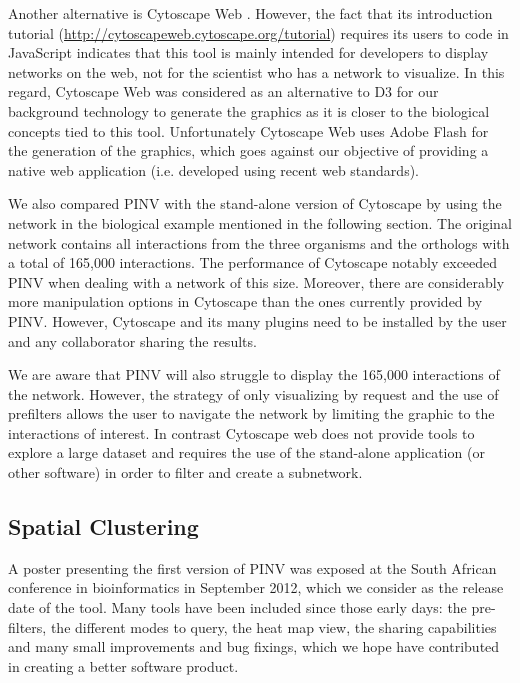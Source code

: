 Another alternative is Cytoscape Web \cite{LOP2010}. However, the fact that its introduction tutorial (\url{http://cytoscapeweb.cytoscape.org/tutorial}) requires its users to code in JavaScript indicates that this tool is mainly intended for developers to display networks on the web, not for the scientist who has a network to visualize. In this regard, Cytoscape Web was considered as an alternative to D3 for our background technology to generate the graphics as it is closer to the biological concepts tied to this tool. Unfortunately Cytoscape Web uses Adobe Flash for the generation of the graphics, which goes against our objective of providing a native web application (i.e. developed using recent web standards). 

We also compared PINV with the stand-alone version of Cytoscape by using the network in the biological example mentioned in the following section. The original network contains all interactions from the three organisms and the orthologs with a total of 165,000 interactions. 
The performance of Cytoscape notably exceeded PINV when dealing with a network of this size. Moreover, there are considerably more manipulation options in Cytoscape than the ones currently provided by PINV. However, Cytoscape and its many plugins need to be installed by the user and any collaborator sharing the results.

We are aware that PINV will also struggle to display the 165,000 interactions of the network. However, the strategy of only visualizing by request and the use of prefilters  allows the user to navigate the network by limiting the graphic to the interactions of interest. In contrast Cytoscape web does not provide tools to explore a large dataset and requires the use of the stand-alone application (or other software) in order to filter and create a subnetwork.




\subsection{Spatial Clustering} \label{section:clustering}
A poster presenting the first version of PINV was exposed at the South African conference in bioinformatics in September 2012, which we consider as the release date of the tool. Many tools have been included since those early days: the pre-filters, the different modes to query, the heat map view, the sharing capabilities and many small improvements and bug fixings, which we hope have contributed in creating a better software product.

